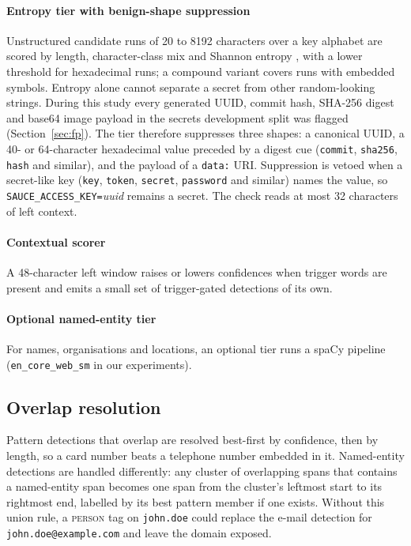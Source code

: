 \paragraph{Entropy tier with benign-shape suppression}
Unstructured candidate runs of 20 to 8192 characters over a key alphabet are scored by length, character-class mix and Shannon entropy \cite{shannon1948}, with a lower threshold for hexadecimal runs; a compound variant covers runs with embedded symbols. Entropy alone cannot separate a secret from other random-looking strings. During this study every generated UUID, commit hash, SHA-256 digest and base64 image payload in the secrets development split was flagged (Section~\ref{sec:fp}). The tier therefore suppresses three shapes: a canonical UUID, a 40- or 64-character hexadecimal value preceded by a digest cue (\texttt{commit}, \texttt{sha256}, \texttt{hash} and similar), and the payload of a \texttt{data:} URI. Suppression is vetoed when a secret-like key (\texttt{key}, \texttt{token}, \texttt{secret}, \texttt{password} and similar) names the value, so \texttt{SAUCE\_ACCESS\_KEY=}\textit{uuid} remains a secret. The check reads at most 32 characters of left context.

\paragraph{Contextual scorer}
A 48-character left window raises or lowers confidences when trigger words are present and emits a small set of trigger-gated detections of its own.

\paragraph{Optional named-entity tier}
For names, organisations and locations, an optional tier runs a spaCy pipeline (\texttt{en\_core\_web\_sm} in our experiments).

\subsection{Overlap resolution}
Pattern detections that overlap are resolved best-first by confidence, then by length, so a card number beats a telephone number embedded in it. Named-entity detections are handled differently: any cluster of overlapping spans that contains a named-entity span becomes one span from the cluster's leftmost start to its rightmost end, labelled by its best pattern member if one exists. Without this union rule, a \textsc{person} tag on \texttt{john.doe} could replace the e-mail detection for \texttt{john.doe@example.com} and leave the domain exposed.

